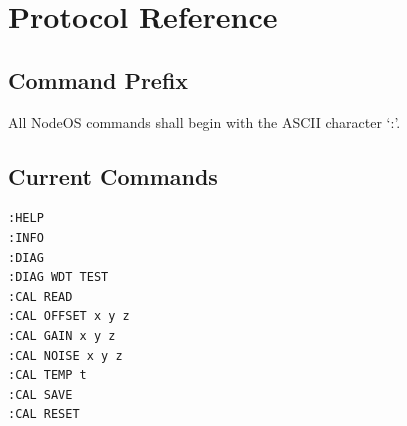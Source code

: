 \chapter{Protocol Reference}

\section{Command Prefix}
All NodeOS commands shall begin with the ASCII character `:'.

\section{Current Commands}
\begin{verbatim}
:HELP
:INFO
:DIAG
:DIAG WDT TEST
:CAL READ
:CAL OFFSET x y z
:CAL GAIN x y z
:CAL NOISE x y z
:CAL TEMP t
:CAL SAVE
:CAL RESET
\end{verbatim}
